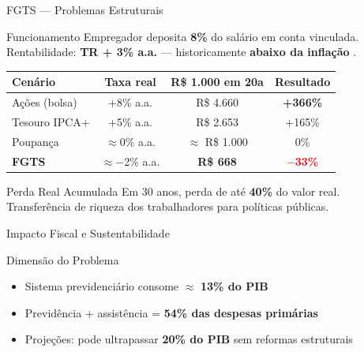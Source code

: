 \documentclass{libs/ufc_format}
\begin{document}
\begin{frame}{FGTS --- Problemas Estruturais}
    \begin{block}{Funcionamento}
        Empregador deposita \textbf{8\%} do salário em conta vinculada. Rentabilidade: \textbf{TR + 3\% a.a.} --- historicamente \textbf{abaixo da inflação} \cite{afonso2016}.
    \end{block}

    \vspace{0.2cm}

    \begin{center}
    \small
    \begin{tabular}{lccc}
        \toprule
        \textbf{Cenário} & \textbf{Taxa real} & \textbf{R\$ 1.000 em 20a} & \textbf{Resultado} \\
        \midrule
        Ações (bolsa) & +8\% a.a. & R\$ 4.660 & \textcolor{green_ufc}{\textbf{+366\%}} \\
        Tesouro IPCA+ & +5\% a.a. & R\$ 2.653 & \textcolor{green_ufc}{+165\%} \\
        Poupança & $\approx$0\% a.a. & $\approx$ R\$ 1.000 & 0\% \\
        \textbf{FGTS} & $\approx$$-$2\% a.a. & \textbf{R\$ 668} & \textcolor{red}{\textbf{$-$33\%}} \\
        \bottomrule
    \end{tabular}
    \end{center}

    \vspace{0.1cm}

    \begin{alertblock}{Perda Real Acumulada \cite{insper2019}}
        Em 30 anos, perda de até \textbf{40\%} do valor real. Transferência de riqueza dos trabalhadores para políticas públicas.
    \end{alertblock}
\end{frame}

\begin{frame}{Impacto Fiscal e Sustentabilidade}
    \begin{alertblock}{Dimensão do Problema}
        \begin{itemize}
            \item Sistema previdenciário consome $\approx$ \textbf{13\% do PIB}
            \item Previdência + assistência = \textbf{54\% das despesas primárias} \cite{ifi2023}
            \item Projeções: pode ultrapassar \textbf{20\% do PIB} sem reformas estruturais \cite{tafner2019}
        \end{itemize}
    \end{alertblock}

    \vspace{0.3cm}

\end{frame}
\end{document}
